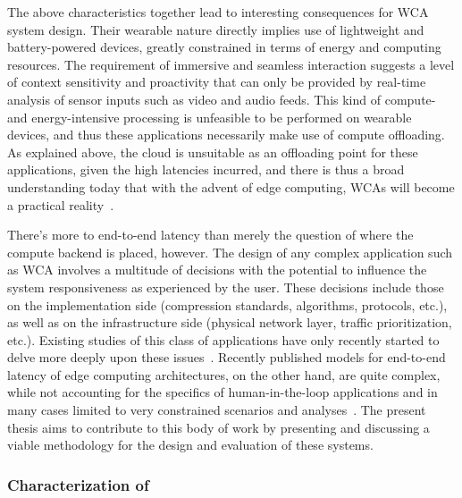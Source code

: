 The above characteristics together lead to interesting consequences for \gls{WCA} system design.
Their wearable nature directly implies use of lightweight and battery-powered devices, greatly constrained in terms of energy and computing resources.
The requirement of immersive and seamless interaction suggests a level of context sensitivity and proactivity that can only be provided by real-time analysis of sensor inputs such as video and audio feeds.
This kind of compute- and energy-intensive processing is unfeasible to be performed on wearable devices, and thus these applications necessarily make use of compute offloading.
As explained above, the cloud is unsuitable as an offloading point for these applications, given the high latencies incurred, and there is thus a broad understanding today that with the advent of edge computing, \glspl{WCA} will become a practical reality~\cite{bittmann2017edge,flinn2012cyber,chen2017empirical,ha2013just,wang2020scaling,chen2018application,ha2014towards}.

There's more to end-to-end latency than merely the question of where the compute backend is placed, however.
The design of any complex application such as \gls{WCA} involves a multitude of decisions with the potential to influence the system responsiveness as experienced by the user.
These decisions include those on the implementation side (compression standards, algorithms, protocols, etc.), as well as on the infrastructure side (physical network layer, traffic prioritization, etc.).
Existing studies of this class of applications have only recently started to delve more deeply upon these issues~\cite{chen2017empirical,wang2019towards,wang2020scaling,ha2014towards,chen2015early,satyanarayanan2009case,chatzopoulos2017hyperion}.
Recently published models for end-to-end latency of edge computing architectures, on the other hand, are quite complex, while not accounting for the specifics of human-in-the-loop applications and in many cases limited to very constrained scenarios and analyses~\cite{al_zubaidy2015performance,schiessl2017finite,moothedath2022energy2,moothedath2022energy1,moothedath2021energy}.
The present thesis aims to contribute to this body of work by presenting and discussing a viable methodology for the design and evaluation of these systems.

\subsubsection{Characterization of }

